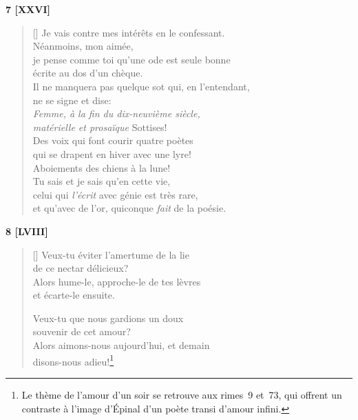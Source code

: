 \documentclass[a4paper,12pt]{book}
\begin{document}
\bigskip

\begin{center}
  \textbf{7 [XXVI]}
\end{center}

\settowidth{\versewidth}{je pense comme toi qu'une ode est seule bonne}

\begin{verse}[\versewidth]
  Je vais contre mes intérêts en le confessant. \\
  Néanmoins, mon aimée, \\
  je pense comme toi qu'une ode est seule bonne \\
  écrite au dos d'un chèque. \\
  Il ne manquera pas quelque sot qui, en l'entendant, \\
  ne se signe et dise: \\
  \emph{Femme, à la fin du dix-neuvième siècle, \\
    matérielle et prosaïque} Sottises! \\
  Des voix qui font courir quatre poètes \\
  qui se drapent en hiver avec une lyre! \\
  Aboiements des chiens à la lune! \\
  Tu sais et je sais qu'en cette vie, \\
  celui qui \emph{l'écrit} avec génie est très rare, \\
  et qu'avec de l'or, quiconque \emph{fait} de la poésie.
\end{verse}

\bigskip

\begin{center}
  \textbf{8 [LVIII]}
\end{center}

\settowidth{\versewidth}{Alors hume-le, approche-le de tes lèvres}

\begin{verse}[\versewidth]
  Veux-tu éviter l'amertume de la lie \\
  de ce nectar délicieux? \\
  Alors hume-le, approche-le de tes lèvres \\
  et écarte-le ensuite.

  Veux-tu que nous gardions un doux \\
  souvenir de cet amour? \\
  Alors aimons-nous aujourd'hui, et demain \\
  disons-nous adieu!\footnote{Le thème de l'amour d'un soir se
  retrouve aux rimes~9 et~73, qui offrent un contraste à l'image
  d'Épinal d'un poète transi d'amour infini.}
\end{verse}
\end{document}
